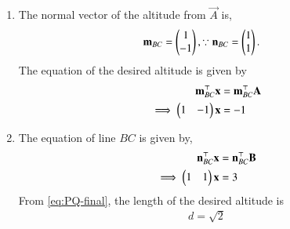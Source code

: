 \begin{enumerate}
\item The normal vector of the altitude from $\vec{A}$ is,
\begin{align}
\mathbf{m}_{BC}
= \begin{pmatrix}1\\-1\end{pmatrix},
\because \mathbf{n}_{BC} &= \begin{pmatrix}1\\1\end{pmatrix}.
\end{align}
The equation of the desired altitude  is given by
\begin{align}
\mathbf{m}_{BC}^{\top}\mathbf{x} &=\mathbf{m}_{BC}^{\top}\mathbf{A}\\
\implies \begin{pmatrix}1&-1\end{pmatrix}\mathbf{x} &= -1
\end{align}
	\item
The equation of line $BC$ is given by,
\begin{align}
{\mathbf{n}^{\top}_{BC}}\mathbf{x} &= {\mathbf{n}^{\top}_{BC}}\mathbf{B}\\
\implies \begin{pmatrix}1&1\end{pmatrix}\mathbf{x}  &= 3
\end{align}
			From \eqref{eq:PQ-final},
the length of the desired altitude is 
\begin{align}
d =  \sqrt{2}
\end{align}

\end{enumerate}

